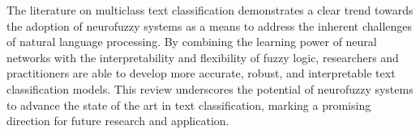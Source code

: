 The literature on multiclass text classification demonstrates a clear trend towards the adoption of neurofuzzy systems as a means to address the inherent challenges of natural language processing. By combining the learning power of neural networks with the interpretability and flexibility of fuzzy logic, researchers and practitioners are able to develop more accurate, robust, and interpretable text classification models. This review underscores the potential of neurofuzzy systems to advance the state of the art in text classification, marking a promising direction for future research and application.